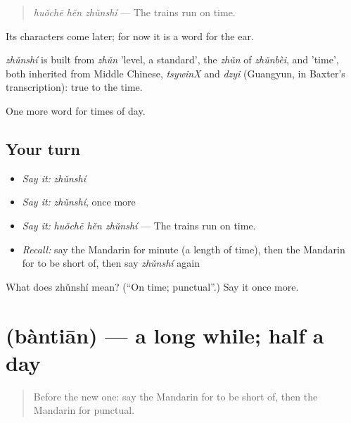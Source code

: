 \begin{quote}
\emph{huǒchē hěn zhǔnshí} — The trains run on time.
\end{quote}

Its characters come later; for now it is a word for the ear.

\begin{cousinweb}
\emph{zhǔnshí} is built from \emph{zhǔn} 'level, a standard', the \emph{zhǔn} of \emph{zhǔnbèi}, and  'time', both inherited from Middle Chinese, \emph{tsywinX} and \emph{dzyi} (Guangyun, in Baxter's transcription): true to the time.
\end{cousinweb}

\begin{grammarlens}[title={What you've built}]
One more word for times of day.
\end{grammarlens}

\subsection*{Your turn}
\begin{itemize}
\raggedright
  \item \emph{Say it:} \emph{zhǔnshí}
  \item \emph{Say it:} \emph{zhǔnshí}, once more
  \item \emph{Say it:} \emph{huǒchē hěn zhǔnshí} — The trains run on time.
  \item \emph{Recall:} say the Mandarin for minute (a length of time), then the Mandarin for to be short of, then say \emph{zhǔnshí} again
\end{itemize}

\begin{tcolorbox}[breakable,colback=teal!4,colframe=teal!35!black,title={Before you move on}]
What does zhǔnshí mean? (\textquotedblleft{}On time; punctual\textquotedblright{}.) Say it once more.
\end{tcolorbox}
\section[\texorpdfstring{\zh{半天} (bàntiān)}{半天 (bàntiān)}]{ (bàntiān) — a long while; half a day}

\label{lesson:ZH-C143-bantian}



\begin{quote}
Before the new one: say the Mandarin for to be short of, then the Mandarin for punctual.
\end{quote}


